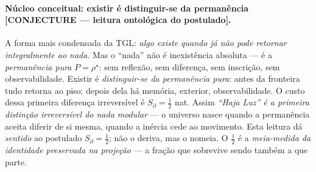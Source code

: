 \documentclass[12pt,a4paper]{article}
\newcommand{\rhostar}{\rho^{\star}}
\newcommand{\TGL}{\textsc{TGL}}
\begin{document}
\paragraph{Núcleo conceitual: existir é distinguir-se da permanência \textbf{[CONJECTURE --- leitura ontológica do postulado]}.} A forma mais condensada da \TGL{}: \emph{algo existe quando já não pode retornar integralmente ao nada}. Mas o ``nada'' não é inexistência absoluta --- é a \emph{permanência pura} $P = \rhostar$: sem reflexão, sem diferença, sem inscrição, sem observabilidade. Existir é \emph{distinguir-se da permanência pura}: antes da fronteira tudo retorna ao piso; depois dela há memória, exterior, observabilidade. O custo dessa primeira diferença irreversível é $S_\partial = \tfrac12$ nat. Assim \emph{``Haja Luz'' é a primeira distinção irreversível do nada modular} --- o universo nasce quando a permanência aceita diferir de si mesma, quando a inércia cede ao movimento. Esta leitura dá \emph{sentido} ao postulado $S_\partial = \tfrac12$; não o deriva, mas o nomeia. O $\tfrac12$ é a \emph{meia-medida da identidade preservada na projeção} --- a fração que sobrevive sendo também a que parte.
\end{document}
